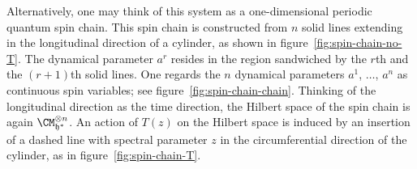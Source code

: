 Alternatively, one may think of this system as a one-dimensional
periodic quantum spin chain.  This spin chain is constructed from $n$
solid lines extending in the longitudinal direction of a cylinder, as
shown in figure~\ref{fig:spin-chain-no-T}.  The dynamical parameter
$a^r$ resides in the region sandwiched by the $r$th and the
$(r+1)$th solid lines.  One regards the $n$ dynamical parameters
$a^1$, $\dotsc$, $a^n$ as continuous spin variables; see
figure~\ref{fig:spin-chain-chain}.  Thinking of the longitudinal
direction as the time direction, the Hilbert space of the spin chain
is again $\CM_{\hf^*}^{\otimes n}$.  An action of $T(z)$ on the
Hilbert space is induced by an insertion of a dashed line with spectral
parameter $z$ in the circumferential direction of the cylinder, as in
figure~\ref{fig:spin-chain-T}.

